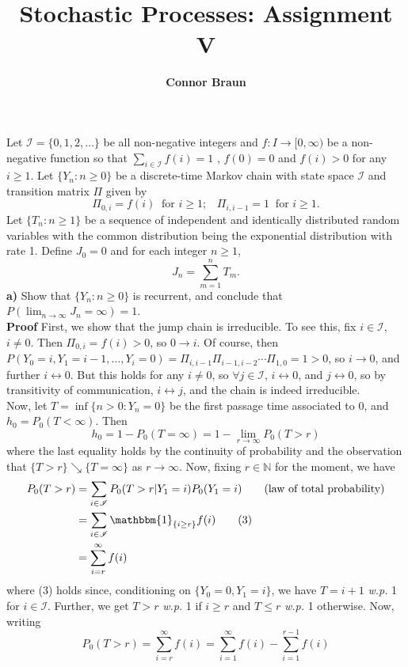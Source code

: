 \documentclass[11pt, letterpaper]{article}
\title{\bf Stochastic Processes: Assignment V}
\author{\bf Connor Braun}
\date{}
\newcommand{\mbb}[1]{\mathbb{#1}}
\newcommand{\mc}[1]{\mathcal{#1}}
\begin{document}
    \maketitle
     Let $\mc{I}=\{0,1,2,\dots\}$ be all non-negative integers and $f:I\rightarrow[0,\infty)$ be a non-negative function so that $\sum_{i\in\mc{I}}f(i)=1$
    , $f(0)=0$ and $f(i)>0$ for any $i\geq 1$. Let $\{Y_n:n\geq 0\}$ be a discrete-time Markov chain with state space $\mc{I}$ and transition matrix $\Pi$ given by
    \[\Pi_{0,i}=f(i)\;\;\text{for $i\geq 1$;}\quad\Pi_{i,i-1}=1\;\;\text{for $i\geq 1$.}\]
    Let $\{T_n:n\geq 1\}$ be a sequence of independent and identically distributed random variables with the common distribution being the exponential distribution with rate 1.
    Define $J_0=0$ and for each integer $n\geq 1$,
    \[J_n=\sum_{m=1}^nT_m.\]
    {\bf a)} Show that $\{Y_n:n\geq 0\}$ is recurrent, and conclude that $P(\lim_{n\rightarrow\infty}J_n=\infty)=1$.\\[10pt]
    {\bf Proof} First, we show that the jump chain is irreducible. To see this, fix $i\in\mc{I}$, $i\neq 0$. Then $\Pi_{0,i}=f(i)>0$, so $0\longrightarrow i$.
    Of course, then $P(Y_0=i,Y_1=i-1,\dots,Y_i=0)=\Pi_{i,i-1}\Pi_{i-1,i-2}\cdots\Pi_{1,0}=1>0$, so $i\longrightarrow 0$, and further $i\longleftrightarrow 0$.
    But this holds for any $i\neq 0$, so $\forall j\in\mc{I}$, $i\longleftrightarrow 0$, and $j\longleftrightarrow 0$, so by transitivity of communication, $i\longleftrightarrow j$,
    and the chain is indeed irreducible.\\[10pt]
    Now, let $T=\inf\{n>0:Y_n=0\}$ be the first passage time associated to $0$, and $h_0=P_0(T<\infty)$. Then
    \[h_0=1-P_0(T=\infty)=1-\lim_{r\rightarrow\infty}P_0(T>r)\]
    where the last equality holds by the continuity of probability and the observation that $\{T>r\}\searrow\{T=\infty\}$ as $r\rightarrow\infty$. Now, fixing $r\in\mbb{N}$ for the moment, we have
    \begin{align*}
        P_0(T>r)&=\sum_{i\in\mc{I}}P_0(T>r|Y_1=i)P_0(Y_1=i)\tag{law of total probability}\\
        &=\sum_{i\in\mc{I}}\mathbbm{1}_{\{i\geq r\}}f(i)\tag{3}\\
        &=\sum_{i=r}^\infty f(i)
    \end{align*}
    where (3) holds since, conditioning on $\{Y_0=0,Y_1=i\}$, we have $T=i+1$ {\it w.p.} 1 for $i\in\mc{I}$. Further, we get $T>r$ {\it w.p.} 1 if $i\geq r$ and $T\leq r$ {\it w.p.} 1 otherwise. Now, writing
    \[P_0(T>r)=\sum_{i=r}^\infty f(i)=\sum_{i=1}^\infty f(i) - \sum_{i=1}^{r-1}f(i)\]
\end{document}
